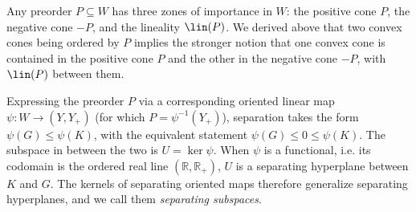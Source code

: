 \documentclass{article}
\theoremstyle{plain}
\theoremstyle{definition}
\theoremstyle{remark}
\begin{document}
Any preorder $P \subseteq W$ has three zones of importance in $W$:
the positive cone $P$, the negative cone $-P$, and the lineality $\lin(P)$.
We derived above that two convex cones being ordered by $P$ implies
the stronger notion that one convex cone is contained in the positive cone $P$ and the other in the negative cone $-P$,
with $\lin(P)$ between them.

Expressing the preorder $P$ via a corresponding oriented linear map
$\psi:W \to (Y, Y_+)$ (for which $P = \psi^{-1}(Y_+)$), separation takes the form
$\psi(G)\le \psi(K)$, with the equivalent statement $\psi(G) \leq 0 \leq \psi(K)$.
The subspace in between the two is $U = \ker \psi$.
When $\psi$ is a functional, i.e. its codomain is the ordered real line $(\mathbb{R}, \mathbb{R}_+)$, $U$ is a
separating hyperplane between $K$ and $G$. The kernels of separating oriented
maps therefore generalize separating hyperplanes, and we call them \emph{separating subspaces}.
\end{document}
